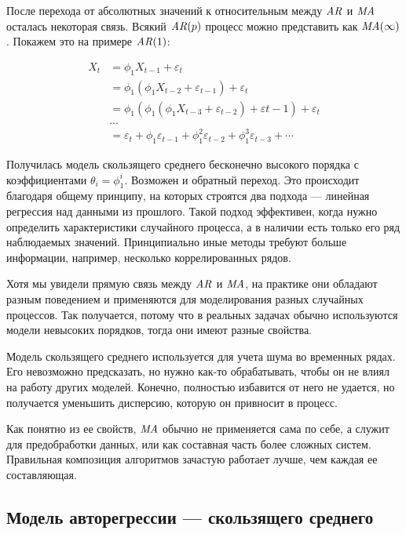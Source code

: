 После перехода от абсолютных значений к относительным между $\mathit{AR}$ и $\mathit{MA}$ осталась некоторая связь. Всякий $\mathit{AR}(p)$ процесс можно представить как $\mathit{MA}(\infty)$. Покажем это на примере $\mathit{AR}(1)$:

\begin{equation}
  \label{eq:theory:ar_as_ma}
  \begin{split}
    X_t & = \phi_1 X_{t-1} + \varepsilon_t \\
        & = \phi_1 (\phi_1 X_{t-2} + \varepsilon_{t-1}) + \varepsilon_t \\
        & = \phi_1 (\phi_1 (\phi_1 X_{t-3} + \varepsilon_{t-2}) + \varepsilon{t-1}) + \varepsilon_t \\
        & \dotso \\
        & = \varepsilon_t + \phi_1 \varepsilon_{t-1} + \phi_1^2 \varepsilon_{t-2} + \phi_1^3 \varepsilon_{t-3} + \dotsb
  \end{split}
\end{equation}

Получилась модель скользящего среднего бесконечно высокого порядка с коэффициентами $\theta_i = \phi_1^i$. Возможен и обратный переход. Это происходит благодаря общему принципу, на которых строятся два подхода --- линейная регрессия над данными из прошлого. Такой подход эффективен, когда нужно определить характеристики случайного процесса, а в наличии есть только его ряд наблюдаемых значений. Принципиально иные методы требуют больше информации, например, несколько коррелированных рядов.

Хотя мы увидели прямую связь между $\mathit{AR}$ и $\mathit{MA}$, на практике они обладают разным поведением и применяются для моделирования разных случайных процессов. Так получается, потому что в реальных задачах обычно используются модели невысоких порядков, тогда они имеют разные свойства.

Модель скользящего среднего используется для учета шума во временных рядах. Его невозможно предсказать, но нужно как-то обрабатывать, чтобы он не влиял на работу других моделей. Конечно, полностью избавится от него не удается, но получается уменьшить дисперсию, которую он привносит в процесс.

Как понятно из ее свойств, $\mathit{MA}$ обычно не применяется сама по себе, а служит для предобработки данных, или как составная часть более сложных систем. Правильная композиция алгоритмов зачастую работает лучше, чем каждая ее составляющая.


\subsection{Модель авторегрессии --- скользящего среднего}

